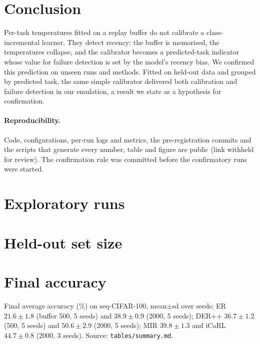 \documentclass[11pt]{article}
\begin{document}
\section{Conclusion}
Per-task temperatures fitted on a replay buffer do not calibrate a class-incremental learner. They
detect recency: the buffer is memorised, the temperatures collapse, and the calibrator becomes a
predicted-task indicator whose value for failure detection is set by the model's recency bias. We
confirmed this prediction on unseen runs and methods. Fitted on held-out data and grouped by
predicted task, the same simple calibrator delivered both calibration and failure detection in our
emulation, a result we state as a hypothesis for confirmation.

\paragraph{Reproducibility.} Code, configurations, per-run logs and metrics, the pre-registration
commits and the scripts that generate every number, table and figure are public (link withheld for
review). The confirmation rule was committed before the confirmatory runs were started.




\appendix
\section{Exploratory runs}\label{app:explore}


\section{Held-out set size}\label{app:size}


\section{Final accuracy}\label{app:acc}
Final average accuracy (\%) on seq-CIFAR-100, mean$\pm$sd over seeds: ER $21.6\pm1.8$ (buffer 500,
5 seeds) and $38.9\pm0.9$ (2000, 5 seeds); DER++ $36.7\pm1.2$ (500, 5 seeds) and $50.6\pm2.9$ (2000,
5 seeds); MIR $39.8\pm1.3$ and iCaRL $44.7\pm0.8$ (2000, 3 seeds). Source: \texttt{tables/summary.md}.
\end{document}
